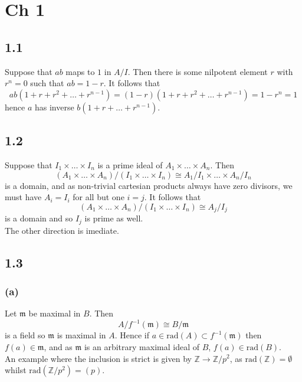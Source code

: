 \documentclass{article}
\theoremstyle{definition}
\newcommand{\Z}{\mathbb{Z}}
\newcommand{\rad}{\text{rad}}
\begin{document}
\section*{Ch 1}

\subsection*{1.1}

Suppose that $ab$ maps to $1$ in $A/I$. Then there is some nilpotent element
$r$ with $r^n = 0$ such that $ab = 1 - r$. It follows that 
\[
	ab(1 + r + r^{2} + \ldots + r^{n - 1})
	=
	(1 - r)(1 + r + r^{2} + \ldots + r^{n - 1})
	=
	1 - r^{n}
	=
	1
\] 
hence $a$ has inverse $b(1 + r + \ldots + r^{n - 1})$.

\subsection*{1.2}

Suppose that $I_1 \times \ldots \times I_n$ is a prime ideal of $A_1 \times
\ldots \times A_n$. Then
\[
	(A_1 \times \ldots \times A_n) / (I_1 \times \ldots \times I_n)
	\cong 
	A_1/I_1 \times \ldots \times A_n / I_n
\]
is a domain, and as non-trivial cartesian products always have zero divisors,
we must have $A_i = I_i$ for all but one $i = j$. It follows that 
\[
	(A_1 \times \ldots \times A_n) / (I_1 \times \ldots \times I_n)
	\cong 
	A_j / I_j
\]
is a domain and so $I_j$ is prime as well. \\

The other direction is imediate.

\subsection*{1.3}
\subsubsection*{(a)}

Let $\mathfrak{m}$ be maximal in $B$. Then 
\[
	A/f^{-1}(\mathfrak{m})
	\cong 
	B/\mathfrak{m}
\] 
is a field so $\mathfrak{m}$ is maximal in $A$. Hence if $a \in \rad(A) \subset
f^{-1}(\mathfrak{m})$ then $f(a) \in \mathfrak{m}$, and as $\mathfrak{m}$ is an
arbitrary maximal ideal of $B$, $f(a) \in \rad(B)$. \\

An example where the inclusion is strict is given by $\Z \to \Z / p^2$, as
$\rad(\Z) = \emptyset$ whilst $\rad(\Z / p^{2}) = (p)$.
\end{document}
